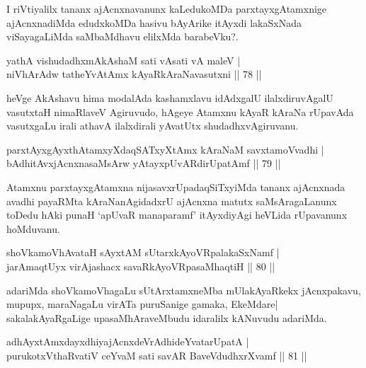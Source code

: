 \begin{artha}
I riVtiyalilx tananx ajAcnxnavanunx kaLedukoMDa parxtayxgAtamxnige ajAcnxnadiMda edudxkoMDa hasivu bAyArike itAyxdi lakaSxNada viSayagaLiMda saMbaMdhavu elilxMda barabeVku?.
\end{artha}


\begin{shl}
yathA vishudadhxmAkAshaM sati vA\s sati vA maleV |\\
niVhArAdw tatheYvA\s \s tAmx kAyaRkAraNavasutxni \hfill || 78 ||
\end{shl}

\begin{artha}
heVge AkAshavu hima modalAda kashamxlavu idAdxgalU ilalxdiruvAgalU vasutxtaH nimaRlaveV Agiruvudo, hAgeye Atamxnu kAyaR kAraNa rUpavAda vasutxgaLu irali athavA ilalxdirali yAvatUtx shudadhxvAgiruvanu.
\end{artha}

\begin{shl}
parxtAyxgAyxthAtamxyXdaqSATxyX\s \s tAmx kAraNaM savxtamoVvadhi |\\
bAdhitAvx\s jAcnxnasaMsArw yAtayxpUvARdirUpatAmf \hfill || 79 ||
\end{shl}

\begin{artha}
Atamxnu parxtayxgAtamxna nijasavxrUpadaqSiTxyiMda tananx ajAcnxnada avadhi payaRMta kAraNanAgidadxrU ajAcnxna matutx saMsAragaLanunx toDedu hAki punaH `apUvaR manaparamf' itAyxdiyAgi heVLida rUpavanunx hoMduvanu.
\end{artha}


\begin{shl}
shoVkamoVhAvataH sAyxtAM sUtarxkAyoVRpalakaSxNamf |\\
jarAmaqtUyx virAjashacx savaRkAyoVRpasaMhaqtiH \hfill || 80 ||
\end{shl}

\begin{artha}
adariMda shoVkamoVhagaLu sUtArxtamxneMba mUlakAyaRkekx jAcnxpakavu, mupupx, maraNagaLu virATa puruSanige gamaka, EkeMdare| sakalakAyaRgaLige upasaMhAraveMbudu idaralilx kANuvudu adariMda.
\end{artha}

\begin{shl}
adhAyxtAmxdayxdhiyajAcnxdeVrAdhideYvatarUpatA |\\
purukotxV\s thaRvatiV ceYvaM sati savAR BaveVdudhxrXvamf \hfill || 81 ||
\end{shl}

